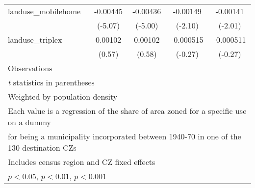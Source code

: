 \begin{table}[htbp]
\begin{tabular}{l*{4}{c}}
\addlinespace
landuse\_mobilehome  &    -0.00445\sym{***}&    -0.00436\sym{***}&    -0.00149\sym{*}  &    -0.00141\sym{*}  \\
                    &     (-5.07)         &     (-5.00)         &     (-2.10)         &     (-2.01)         \\
\addlinespace
landuse\_triplex     &     0.00102         &     0.00102         &   -0.000515         &   -0.000511         \\
                    &      (0.57)         &      (0.58)         &     (-0.27)         &     (-0.27)         \\
\midrule
Observations        &                     &                     &                     &                     \\
\bottomrule
\multicolumn{5}{l}{\footnotesize \textit{t} statistics in parentheses}\\
\multicolumn{5}{l}{\footnotesize Weighted by population density}\\
\multicolumn{5}{l}{\footnotesize Each value is a regression of the share of area zoned for a specific use on a dummy}\\
\multicolumn{5}{l}{\footnotesize for being a municipality incorporated between 1940-70 in one of the 130 destination CZs}\\
\multicolumn{5}{l}{\footnotesize Includes census region and CZ fixed effects}\\
\multicolumn{5}{l}{\footnotesize \sym{*} \(p<0.05\), \sym{**} \(p<0.01\), \sym{***} \(p<0.001\)}\\
\end{tabular}
\end{table}
